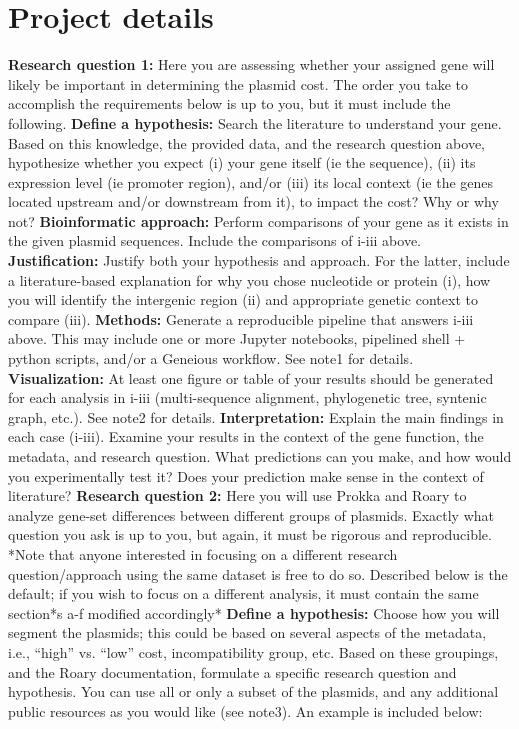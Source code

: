 \documentclass{article}
\begin{document}
\section*{Project details}
\begin{outline}[enumerate]
\1 \textbf{Research question 1:} Here you are assessing whether your assigned gene will likely be important in determining the plasmid cost. The order you take to accomplish the requirements below is up to you, but it must include the following. 
    \2 \textbf{Define a hypothesis:} Search the literature to understand your gene. Based on this knowledge, the provided data, and the research question above, hypothesize whether you expect (i) your gene itself (ie the sequence), (ii) its expression level (ie promoter region), and/or (iii) its local context (ie the genes located upstream and/or downstream from it), to impact the cost? Why or why not?
    \2 \textbf{Bioinformatic approach:} Perform comparisons of your gene as it exists in the given plasmid sequences. Include the comparisons of i-iii above.
    \2 \textbf{Justification:} Justify both your hypothesis and approach. For the latter, include a literature-based explanation for why you chose nucleotide or protein (i), how you will identify the intergenic region (ii) and appropriate genetic context to compare (iii). 
    \2 \textbf{Methods:} Generate a reproducible pipeline that answers i-iii above. This may include one or more Jupyter notebooks, pipelined shell + python scripts, and/or a Geneious workflow. See note1 for details.
    \2 \textbf{Visualization: }At least one figure or table of your results should be generated for each analysis in i-iii (multi-sequence alignment, phylogenetic tree, syntenic graph, etc.). See note2 for details.
    \2 \textbf{Interpretation: }Explain the main findings in each case (i-iii). Examine your results in the context of the gene function, the metadata, and research question. What predictions can you make, and how would you experimentally test it? Does your prediction make sense in the context of literature?
\1 \textbf{Research question 2:} Here you will use Prokka and Roary to analyze gene-set differences between different groups of plasmids. Exactly what question you ask is up to you, but again, it must be rigorous and reproducible. *Note that anyone interested in focusing on a different research question/approach using the same dataset is free to do so. Described below is the default; if you wish to focus on a different analysis, it must contain the same section*s a-f modified accordingly*
    \2 \textbf{Define a hypothesis: }Choose how you will segment the plasmids; this could be based on several aspects of the metadata, i.e., “high” vs. “low” cost, incompatibility group, etc. Based on these groupings, and the Roary documentation, formulate a specific research question and hypothesis. You can use all or only a subset of the plasmids, and any additional public resources as you would like (see note3). An example is included below:\\

\end{outline}
\end{document}
